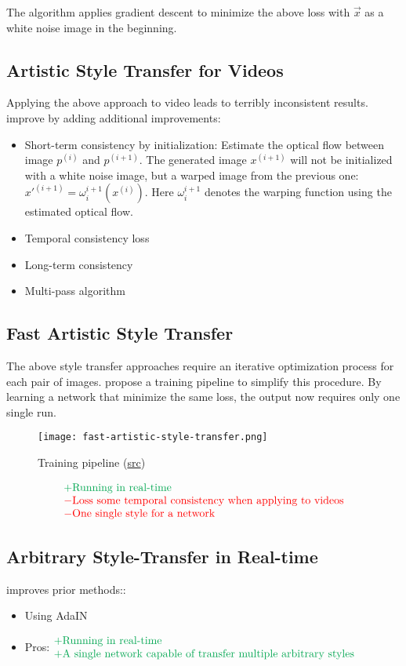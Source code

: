 The algorithm applies gradient descent to minimize the above loss with $\vec{x}$ as a white noise image in the beginning.

\subsection{Artistic Style Transfer for Videos}
Applying the above approach to video leads to terribly inconsistent results.  improve by adding additional improvements:
\begin{itemize}
	\item Short-term consistency by initialization: Estimate the optical flow between image $p^{(i)}$ and $p^{(i+1)}$. The generated image $x^{(i+1)}$ will not be initialized with a white noise image, but a warped image from the previous one: $x'^{(i+1)} = \omega_i^{i+1} (x^{(i)})$. Here $\omega_i^{i+1}$ denotes the warping function using the estimated optical flow.
	\item Temporal consistency loss
	\item Long-term consistency
	\item Multi-pass algorithm
\end{itemize}

\subsection{Fast Artistic Style Transfer}
The above style transfer approaches require an iterative optimization process for each pair of images.  propose a training pipeline to simplify this procedure. By learning a network that minimize the same loss, the output now requires only one single run.
\begin{figure}[hbt!]
	\centering
	\texttt{[image: fast-artistic-style-transfer.png]}
	\caption{Training pipeline (\href{https://youtu.be/VQEMptfWpLk}{src}) \cite{johnson2016perceptual}}
\end{figure}

\[\begin{matrix*}[l]
	\color{Green} + \text{Running in real-time}\\
	\color{red} - \text{Loss some temporal consistency when applying to videos}\\
	\color{red} - \text{One single style for a network}
\end{matrix*}\]

\subsection{Arbitrary Style-Transfer in Real-time}
 improves prior methods::
\begin{itemize}
	\item Using \ac{AdaIN}
	\item Pros: $\begin{matrix*}[l]
		\color{Green} + \text{Running in real-time}\\
		\color{Green} + \text{A single network capable of transfer multiple arbitrary styles}
	\end{matrix*}$
\end{itemize}

